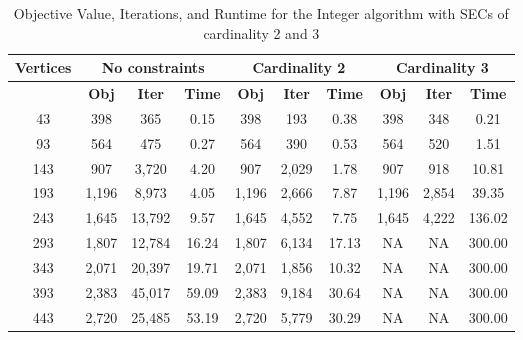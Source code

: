 \documentclass[12pt]{article}
\numberwithin{equation}{section}
\begin{document}
\vspace{1em}


\begin{table}[!ht]
\centering
\begin{tabular}{|c|c|c|c|c|c|c|c|c|c|}
\hline
\textbf{Vertices} & \multicolumn{3}{c|}{\textbf{No constraints}} & \multicolumn{3}{c|}{\textbf{Cardinality 2}} & \multicolumn{3}{c|}{\textbf{Cardinality 3}} \\
\hline
 & \textbf{Obj} & \textbf{Iter} & \textbf{Time} & \textbf{Obj} & \textbf{Iter} & \textbf{Time} & \textbf{Obj} & \textbf{Iter} & \textbf{Time} \\
\hline
     43 &                  398 &                   365 &                  0.15 &                 398 &                  193 &                 0.38 &                 398 &                  348 &                 0.21 \\
      93 &                  564 &                   475 &                  0.27 &                 564 &                  390 &                 0.53 &                 564 &                  520 &                 1.51 \\
     143 &                  907 &                 3,720 &                  4.20 &                 907 &                2,029 &                 1.78 &                 907 &                  918 &                10.81 \\
     193 &                1,196 &                 8,973 &                  4.05 &               1,196 &                2,666 &                 7.87 &               1,196 &                2,854 &                39.35 \\
     243 &                1,645 &                13,792 &                  9.57 &               1,645 &                4,552 &                 7.75 &               1,645 &                4,222 &               136.02 \\
     293 &                1,807 &                12,784 &                 16.24 &               1,807 &                6,134 &                17.13 &                   NA &                    NA &               300.00 \\
     343 &                2,071 &                20,397 &                 19.71 &               2,071 &                1,856 &                10.32 &                   NA &                    NA &               300.00 \\
     393 &                2,383 &                45,017 &                 59.09 &               2,383 &                9,184 &                30.64 &                   NA &                    NA &               300.00 \\
     443 &                2,720 &                25,485 &                 53.19 &               2,720 &                5,779 &                30.29 &                   NA &                    NA &               300.00 \\
\hline
\end{tabular}
\caption{Objective Value, Iterations, and Runtime for the Integer algorithm with SECs of cardinality 2 and 3}
\label{table:q2 - int}
\end{table}
\end{document}
